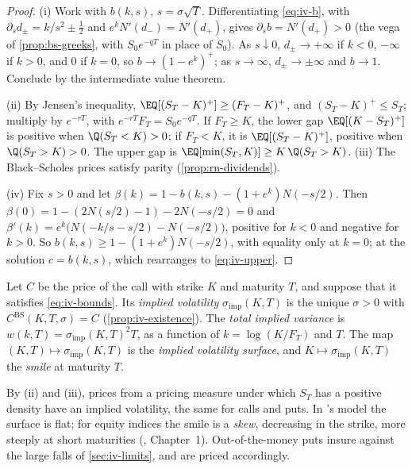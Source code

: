 \begin{proof}
(i) Work with $b(k,s)$, $s=\sigma\sqrt T$. Differentiating \eqref{eq:iv-b}, with
$\partial_sd_\pm=k/s^2\pm\frac12$ and $e^kN'(d_-)=N'(d_+)$, gives $\partial_sb=N'(d_+)>0$ (the vega of
\cref{prop:bs-greeks}, with $S_0e^{-qT}$ in place of $S_0$). As $s\downarrow0$, $d_\pm\to+\infty$ if
$k<0$, $-\infty$ if $k>0$, and $0$ if $k=0$, so $b\to(1-e^k)^+$; as $s\to\infty$, $d_\pm\to\pm\infty$
and $b\to1$. Conclude by the intermediate value theorem.

(ii) By Jensen's inequality, $\EQ[(S_T-K)^+]\ge(F_T-K)^+$, and $(S_T-K)^+\le S_T$; multiply by
$e^{-rT}$, with $e^{-rT}F_T=S_0e^{-qT}$. If $F_T\ge K$, the lower gap $\EQ[(K-S_T)^+]$ is positive when
$\Q(S_T<K)>0$; if $F_T<K$, it is $\EQ[(S_T-K)^+]$, positive when $\Q(S_T>K)>0$. The upper gap is
$\EQ[\min(S_T,K)]\ge K\,\Q(S_T>K)$.
(iii) The Black--Scholes prices satisfy parity (\cref{prop:rn-dividends}).

(iv) Fix $s>0$ and let $\beta(k)=1-b(k,s)-(1+e^k)N(-s/2)$. Then $\beta(0)=1-(2N(s/2)-1)-2N(-s/2)=0$
and $\beta'(k)=e^k\big(N(-k/s-s/2)-N(-s/2)\big)$, positive for $k<0$ and negative for $k>0$. So
$b(k,s)\ge1-(1+e^k)N(-s/2)$, with equality only at $k=0$; at the solution $c=b(k,s)$, which
rearranges to \eqref{eq:iv-upper}.
\end{proof}

\begin{definition}\label{def:iv-implied}
Let $C$ be the price of the call with strike $K$ and maturity $T$, and suppose that it satisfies
\eqref{eq:iv-bounds}. Its \emph{implied volatility} $\sigma_{\mathrm{imp}}(K,T)$ is the unique
$\sigma>0$ with $C^{\mathrm{BS}}(K,T,\sigma)=C$ (\cref{prop:iv-existence}). The \emph{total implied
variance} is $w(k,T)=\sigma_{\mathrm{imp}}(K,T)^2T$, as a function of $k=\log(K/F_T)$ and $T$. The
map $(K,T)\mapsto\sigma_{\mathrm{imp}}(K,T)$ is the \emph{implied volatility surface}, and
$K\mapsto\sigma_{\mathrm{imp}}(K,T)$ the \emph{smile} at maturity $T$.
\end{definition}

By (ii) and (iii), prices from a pricing measure under which $S_T$ has a positive density have an
implied volatility, the same for calls and puts. In \textcite{black-scholes}'s model the surface is
flat; for equity indices the smile is a \emph{skew}, decreasing in the strike, more steeply at short
maturities (\textcite{gatheral-volatility-surface}, Chapter~1). Out-of-the-money puts insure against the
large falls of \cref{sec:iv-limits}, and are priced accordingly.

